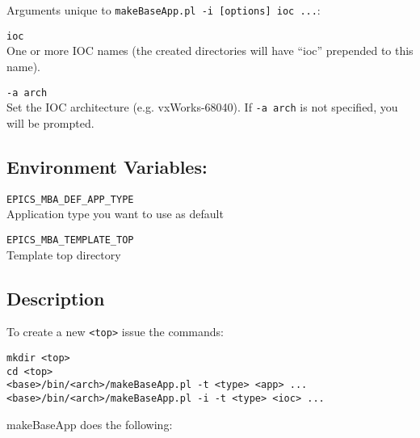 Arguments unique to \verb|makeBaseApp.pl -i [options] ioc ...|:

\begin{description}
\item \verb|ioc| \\
One or more IOC names (the created directories will have ``ioc'' prepended to this name).

\item \verb|-a arch| \\
Set the IOC architecture (e.g. vxWorks-68040).
If \verb|-a arch| is not specified, you will be prompted.
\end{description}

\subsection{Environment Variables:}

\begin{description}
\item \verb|EPICS_MBA_DEF_APP_TYPE| \\
Application type you want to use as default

\item \verb|EPICS_MBA_TEMPLATE_TOP| \\
Template top directory
\end{description}

\subsection{Description}

To create a new \verb|<top>| issue the commands:

\begin{verbatim}
mkdir <top>
cd <top>
<base>/bin/<arch>/makeBaseApp.pl -t <type> <app> ... 
<base>/bin/<arch>/makeBaseApp.pl -i -t <type> <ioc> ...
\end{verbatim}

makeBaseApp does the following:

